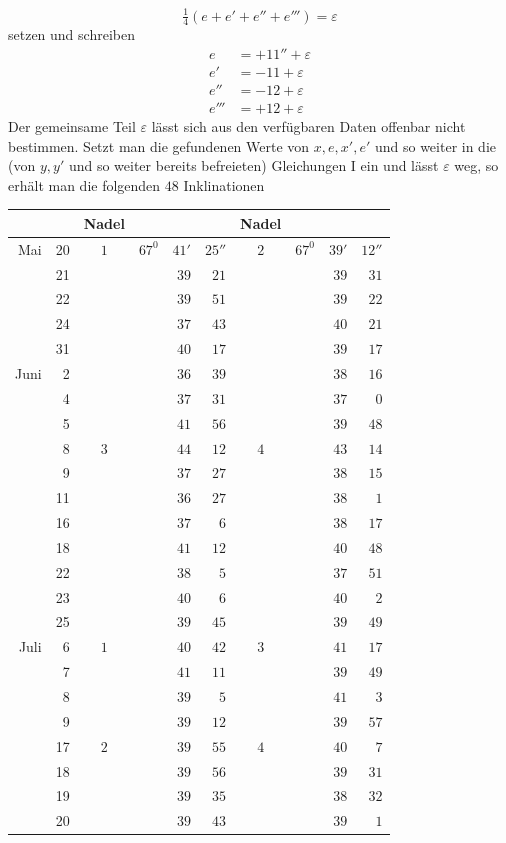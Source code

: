 \[
\tfrac14(e+e'+e''+e''')=\varepsilon
\]
setzen und schreiben
\[
\begin{aligned}
e&=+11''+\varepsilon\\
e'&=-11+\varepsilon\\
e''&=-12+\varepsilon\\
e'''&=+12+\varepsilon
\end{aligned}
\]
Der gemeinsame Teil $\varepsilon$ lässt sich aus den verfügbaren Daten offenbar nicht bestimmen. Setzt man die gefundenen Werte von $x,e,x',e'$ und so weiter in die (von $y,y'$ und so weiter bereits befreieten) Gleichungen I ein und lässt $\varepsilon$ weg, so erhält man die folgenden $48$ Inklinationen
\begin{center}
\begin{tabular}{rr|c|rrr||c|rrr}
&&Nadel&&&&Nadel&&&\\\hline
Mai&20&$1$&$67^0$&$41'$&$25''$&$2$&$67^0$&$39'$&$12''$\\
&21&&&$39$&$21$&&&$39$&$31$\\
&22&&&$39$&$51$&&&$39$&$22$\\
&24&&&$37$&$43$&&&$40$&$21$\\
&31&&&$40$&$17$&&&$39$&$17$\\
Juni&2&&&$36$&$39$&&&$38$&$16$\\
&4&&&$37$&$31$&&&$37$&$0$\\
&5&&&$41$&$56$&&&$39$&$48$\\
&8&$3$&&$44$&$12$&$4$&&$43$&$14$\\
&9&&&$37$&$27$&&&$38$&$15$\\
&11&&&$36$&$27$&&&$38$&$1$\\
&16&&&$37$&$6$&&&$38$&$17$\\
&18&&&$41$&$12$&&&$40$&$48$\\
&22&&&$38$&$5$&&&$37$&$51$\\
&23&&&$40$&$6$&&&$40$&$2$\\
&25&&&$39$&$45$&&&$39$&$49$\\
Juli&6&$1$&&$40$&$42$&$3$&&$41$&$17$\\
&7&&&$41$&$11$&&&$39$&$49$\\
&8&&&$39$&$5$&&&$41$&$3$\\
&9&&&$39$&$12$&&&$39$&$57$\\
&17&$2$&&$39$&$55$&$4$&&$40$&$7$\\
&18&&&$39$&$56$&&&$39$&$31$\\
&19&&&$39$&$35$&&&$38$&$32$\\
&20&&&$39$&$43$&&&$39$&$1$
\end{tabular}
\end{center}

